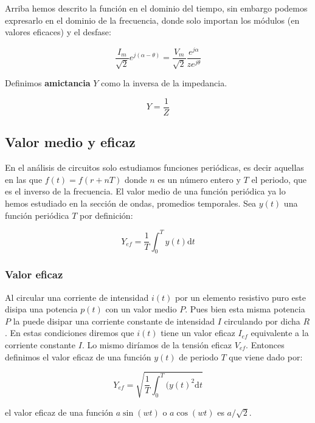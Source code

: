 \documentclass[12pt]{article}
\newcommand{\D}{\mathrm{d}}
\begin{document}
Arriba hemos descrito la función en el dominio del tiempo, sin embargo podemos expresarlo en el dominio de la frecuencia, donde solo importan los módulos (en valores eficaces) y el desfase:

\begin{equation}
\dfrac{I_m}{\sqrt{2}} e^{j(\alpha - \theta)} = \dfrac{V_m}{\sqrt{2}} \dfrac{e^{j\alpha}}{z e^{j \theta}}
\end{equation}

Definimos \textbf{amictancia} $Y$ como la inversa de la impedancia.

\begin{equation}
Y = \dfrac{1}{Z}
\end{equation}

\subsection{Valor medio y eficaz}

En el análisis de circuitos solo estudiamos funciones periódicas, es decir aquellas en las que $f(t) = f(r+nT)$ donde $n$ es un número entero y $T$ el periodo, que es el inverso de la frecuencia. El valor medio de una función periódica ya lo hemos estudiado en la sección de ondas, promedios temporales. Sea $y(t)$ una función periódica $T$ por definición:

\begin{equation}
Y_{ef} = \dfrac{1}{T} \int_0^T y(t) \D t
\end{equation}

\subsubsection{Valor eficaz}

Al circular una corriente de intensidad $i(t)$ por un elemento resistivo puro este disipa una potencia $p(t)$ con un valor medio $P$. Pues bien esta misma potencia $P$ la puede disipar una corriente constante de intensidad $I$ circulando por dicha $R$. En estas condiciones diremos que $i(t)$ tiene un valor eficaz $I_{ef}$ equivalente a la corriente constante $I$. Lo mismo diríamos de la tensión eficaz $V_{ef}$. Entonces definimos el valor eficaz de una función $y(t)$ de periodo $T$ que viene dado por:

\begin{equation}
Y_{ef} = \sqrt{\dfrac{1}{T} \int_0^T (y(t)^2 \D t}
\end{equation}

el valor eficaz de una función $a \sin (wt)$ o $a \cos (wt)$ es $a/\sqrt{2}$.
\end{document}
